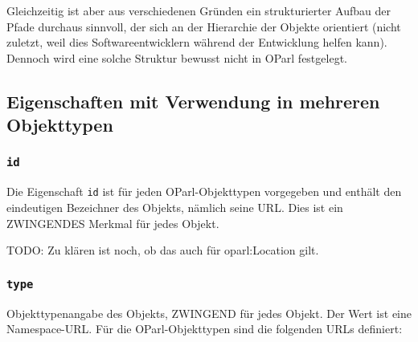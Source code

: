 \documentclass[,a4paper]{article}
\begin{document}
Gleichzeitig ist aber aus verschiedenen Gründen ein strukturierter
Aufbau der Pfade durchaus sinnvoll, der sich an der Hierarchie der
Objekte orientiert (nicht zuletzt, weil dies Softwareentwicklern während
der Entwicklung helfen kann). Dennoch wird eine solche Struktur bewusst
nicht in OParl festgelegt.

\subsection{Eigenschaften mit Verwendung in mehreren
Objekttypen}\label{eigenschaften-mit-verwendung-in-mehreren-objekttypen}

\subsubsection{\texttt{id}}\label{id}

Die Eigenschaft \texttt{id} ist für jeden OParl-Objekttypen vorgegeben
und enthält den eindeutigen Bezeichner des Objekts, nämlich seine URL.
Dies ist ein ZWINGENDES Merkmal für jedes Objekt.

TODO: Zu klären ist noch, ob das auch für oparl:Location gilt.

\subsubsection{\texttt{type}}\label{type}

Objekttypenangabe des Objekts, ZWINGEND für jedes Objekt. Der Wert ist
eine Namespace-URL. Für die OParl-Objekttypen sind die folgenden URLs
definiert:
\end{document}
